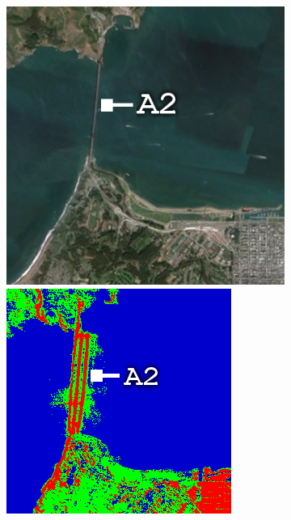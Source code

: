 \begin{figure}[!b]
\begin{subfigure}[t]{0.19\textwidth}
\caption{}
\label{fig:cla2_a}
\end{subfigure}
\begin{subfigure}[t]{0.19\textwidth}
\includegraphics[width=\columnwidth]{Figures/ALOS2_SF_3Class/GoldenGateIm} 
\vspace{0.2cm}
\includegraphics[width=\columnwidth]{Figures/ALOS2_SF_3Class/GoldenGate}

\end{subfigure}
\end{figure}
